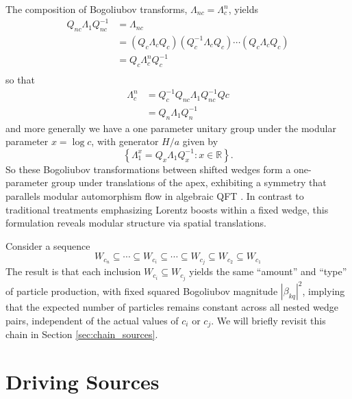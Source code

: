\documentclass[12pt,a4paper]{article}
\begin{document}
The composition of Bogoliubov transforms, $\Lambda_{nc} = \Lambda_c^n$, yields
\begin{equation}
  \begin{array}{ll}    
    Q_{nc} \Lambda_1 Q_{nc}^{-1}  &= \Lambda_{nc} \\
         &= \left(Q_c \Lambda_{c} Q_c\right) \left( Q_c^{-1} \Lambda_{c} Q_c\right) \cdots \left(Q_c \Lambda_{c} Q_c\right) \\
  &= Q_c \Lambda_c^n Q_c^{-1} \\
  \end{array}
\end{equation}
so that
\begin{equation}
  \begin{array}{ll}
  \Lambda_c^n &= Q_c^{-1} Q_{nc} \Lambda_1 Q_{nc}^{-1} Q{c} \\
  &= Q_n \Lambda_1 Q_n^{-1}
  \end{array}
\end{equation}
and more generally we have a one parameter unitary group under the modular parameter $x = \log c$, with generator $H/a$ given by
\begin{equation}
  \left\{\Lambda_1^x = Q_x \Lambda_1 Q_x^{-1} : x \in \mathbb{R} \right\}.
\end{equation}
So these Bogoliubov transformations between shifted wedges form a one-parameter group under translations of the apex, exhibiting a symmetry that parallels modular automorphism flow in algebraic QFT \cite{borchers2000revolutionizing}. In contrast to traditional treatments emphasizing Lorentz boosts within a fixed wedge, this formulation reveals modular structure via spatial translations.

Consider a sequence
\begin{equation}
  W_{c_n} \subseteq \cdots \subseteq W_{c_i} \subseteq \cdots \subseteq W_{c_j} \subseteq W_{c_2} \subseteq W_{c_1}
  \label{chain}
\end{equation}
The result is that each inclusion $W_{c_i} \subseteq W_{c_j}$ yields the same ``amount'' and ``type'' of particle production, with fixed squared Bogoliubov magnitude $|\beta_{kq}|^2$, implying that the expected number of particles remains constant across all nested wedge pairs, independent of the actual values of $c_i$ or $c_j$.  We will briefly revisit this chain in Section \ref{sec:chain_sources}.

\section{Driving Sources} \label{sec:drive}
\end{document}

